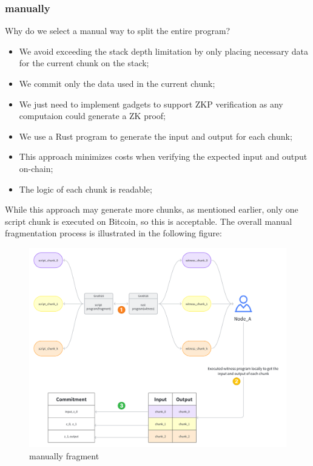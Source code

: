 \subsubsection{manually}

Why do we select a manual way to split the entire program?

\begin{itemize}
    \item We avoid exceeding the stack depth limitation by only placing necessary data for the current chunk on the stack;
    \item We commit only the data used in the current chunk;
    \item We just need to implement gadgets to support ZKP verification as any computaion could generate a ZK proof;
    \item We use a Rust program to generate the input and output for each chunk;
    \item This approach minimizes costs when verifying the expected input and output on-chain;
    \item The logic of each chunk is readable;
\end{itemize}

While this approach may generate more chunks, as mentioned earlier, only one script chunk is executed on Bitcoin, so this is acceptable. 
The overall manual fragmentation process is illustrated in the following figure:

\begin{figure}[ht] 
    \centering  
    \includegraphics[width=0.85\columnwidth]{images/manually-fragment.png} 
    \caption{manually fragment}
    \label{fig:manually-fragment}
\end{figure}

